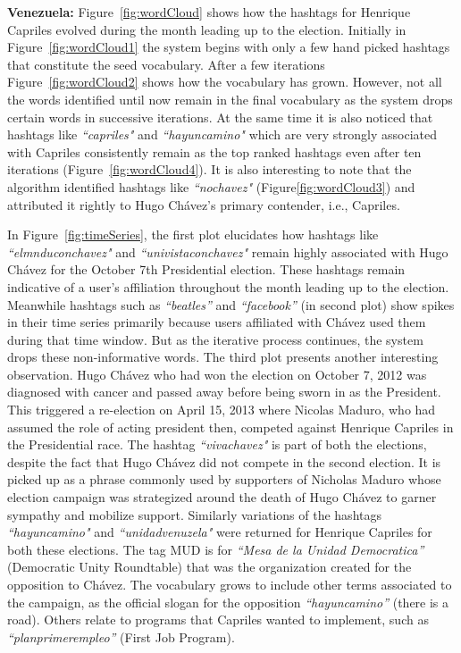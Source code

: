 \noindent
{\bf Venezuela:} 
Figure~\ref{fig:wordCloud} shows how the hashtags for Henrique Capriles evolved during the month leading up to the election.
Initially in Figure~\ref{fig:wordCloud1} the system begins with only a few hand picked hashtags that constitute the seed vocabulary. 
After a few iterations Figure~\ref{fig:wordCloud2} shows how the vocabulary has grown.
However, not all the words identified until now remain in the final vocabulary as the system drops certain words in successive iterations.
At the same time it is also noticed that hashtags like \emph{``capriles"} and \emph{``hayuncamino"} which are very strongly associated with Capriles consistently remain as the top ranked hashtags even after ten iterations (Figure~\ref{fig:wordCloud4}). 
It is also interesting to note that the algorithm identified hashtags like \emph{``nochavez"} (Figure\ref{fig:wordCloud3}) and attributed it rightly to Hugo Ch\'{a}vez's primary contender, i.e., Capriles. 

In Figure~\ref{fig:timeSeries}, the first plot elucidates how hashtags like \emph{``elmnduconchavez"} and 
\emph{``univistaconchavez"} remain highly associated with Hugo Ch\'{a}vez for the October 7th Presidential election. 
These hashtags remain indicative of a user's affiliation throughout the month leading up to the election.
Meanwhile hashtags such as \emph{``beatles''} and \emph{``facebook''} (in second plot) show spikes in their time series primarily because users affiliated with Ch\'{a}vez used them during that time window. 
But as the iterative process continues, the system drops these non-informative words.
The third plot presents another interesting observation.
Hugo Ch\'{a}vez who had won the election on October 7, 2012 was diagnosed with cancer and passed away
before being sworn in as the President.
This triggered a re-election on April 15, 2013 where Nicolas Maduro, who had assumed the role of acting president then, competed 
against Henrique Capriles in the Presidential race.
The hashtag \emph{``vivachavez"} is part of both the elections, despite the 
fact that Hugo Ch\'{a}vez did not compete in the second election.
It is picked up as a phrase commonly used by supporters of Nicholas Maduro whose election campaign was strategized around the death of Hugo Ch\'{a}vez to garner sympathy and mobilize support.
Similarly variations of the hashtags \emph{``hayuncamino"} and \emph{``unidadvenuzela"} were returned 
for Henrique Capriles for both these elections.
The tag MUD is for \emph{``Mesa de la Unidad Democratica”} (Democratic Unity Roundtable) that was the organization created for the opposition to Ch\'{a}vez. 
The vocabulary grows to include other terms associated to the campaign, as the official slogan for the opposition \emph{``hayuncamino”} (there is a road). 
Others relate to programs that Capriles wanted to implement, such as \emph{``planprimerempleo”} (First Job Program). 


